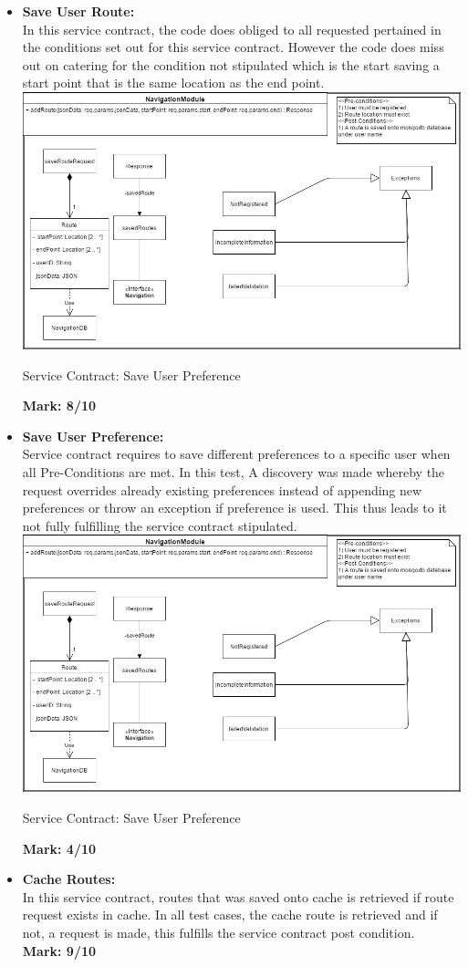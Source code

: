\begin{itemize}
	
\item \textbf{Save User Route:}\\In this service contract, the code does obliged to all requested pertained in the conditions set out for this service contract. However the code does miss out on catering for the condition not stipulated which is the start saving a start point that is the same location as the end point.\\
\includegraphics[scale=0.5]{SaveRoute.png}
\caption{Service Contract: Save User Preference}
	\textbf{Mark: 8/10}
	
\item \textbf{Save User Preference:}\\Service contract requires to save different preferences to a specific user when all Pre-Conditions are met. In this test, A discovery was made whereby the request overrides already existing preferences instead of appending new preferences or throw an exception if preference is used. This thus leads to it not fully fulfilling the service contract stipulated.\\
\includegraphics[scale=0.5]{SaveRoute.png}
\caption{Service Contract: Save User Preference}
	\textbf{Mark: 4/10}
	
\item \textbf{Cache Routes:}\\In this service contract, routes that was saved onto cache is retrieved if route request exists in cache. In all test cases, the cache route is retrieved and if not, a request is made, this fulfills the service contract post condition.\\
	\textbf{Mark: 9/10}
	
\end{itemize}